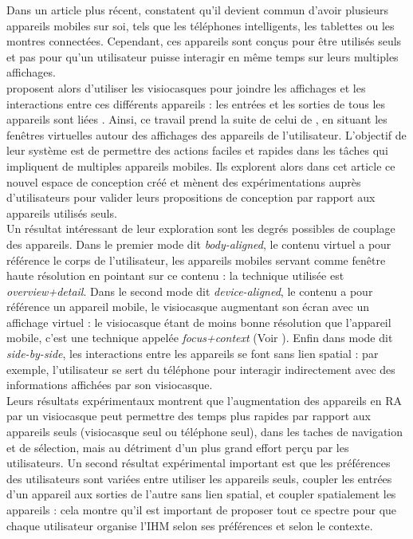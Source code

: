 Dans un article plus récent, \cite{Grubert2015} constatent qu'il devient commun d'avoir plusieurs appareils mobiles sur soi, tels que les téléphones intelligents, les tablettes ou les montres connectées. Cependant, ces appareils sont conçus pour être utilisés seuls et pas pour qu'un utilisateur puisse interagir en même temps sur leurs multiples affichages.\\
\citeauthor{Grubert2015} proposent alors d'utiliser les visiocasques pour joindre les affichages et les interactions entre ces différents appareils : les entrées et les sorties de tous les appareils sont liées . Ainsi, ce travail prend la suite de celui de \citet{Ens2014}, en situant les fenêtres virtuelles autour des affichages des appareils de l'utilisateur. L'objectif de leur système est de permettre des actions faciles et rapides dans les tâches qui impliquent de multiples appareils mobiles. Ils explorent alors dans cet article ce nouvel espace de conception créé et mènent des expérimentations auprès d'utilisateurs pour valider leurs propositions de conception par rapport aux appareils utilisés seuls.\\
Un résultat intéressant de leur exploration sont les degrés possibles de couplage des appareils. Dans le premier mode dit \emph{body-aligned}, le contenu virtuel a pour référence le corps de l'utilisateur, les appareils mobiles servant comme fenêtre haute résolution en pointant sur ce contenu : la technique utilisée est \emph{overview+detail}. Dans le second mode dit \emph{device-aligned}, le contenu a pour référence un appareil mobile, le visiocasque augmentant son écran avec un affichage virtuel : le visiocasque étant de moins bonne résolution que l'appareil mobile, c'est une technique appelée \emph{focus+context} (Voir \cite{BaudischGoodStewart2001}). Enfin dans mode dit \emph{side-by-side}, les interactions entre les appareils se font sans lien spatial : par exemple, l'utilisateur se sert du téléphone pour interagir indirectement avec des informations affichées par son visiocasque.\\
Leurs résultats expérimentaux montrent que l'augmentation des appareils en RA par un visiocasque peut permettre des temps plus rapides par rapport aux appareils seuls (visiocasque seul ou téléphone seul), dans les taches de navigation et de sélection, mais au détriment d'un plus grand effort perçu par les utilisateurs. Un second résultat expérimental important est que les préférences des utilisateurs sont variées entre utiliser les appareils seuls, coupler les entrées d'un appareil aux sorties de l'autre sans lien spatial, et coupler spatialement les appareils : cela montre qu'il est important de proposer tout ce spectre pour que chaque utilisateur organise l'IHM selon ses préférences et selon le contexte.\\
